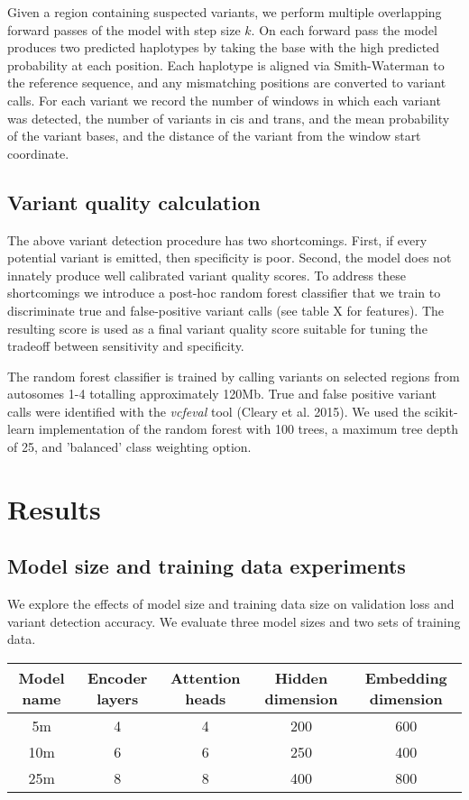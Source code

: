 \documentclass[]{article}
\begin{document}
Given a region containing suspected variants, we perform multiple overlapping forward passes of the model with step size $k$. On each forward pass the model produces two predicted haplotypes by taking the base with the high predicted probability at each position. Each haplotype is aligned via Smith-Waterman to the reference sequence, and any mismatching positions are converted to variant calls. For each variant we record the number of windows in which each variant was detected, the number of variants in cis and trans, and the mean probability of the variant bases, and the distance of the variant from the window start coordinate.

\subsection{Variant quality calculation}

The above variant detection procedure has two shortcomings. First, if every potential variant is emitted, then specificity is poor. Second, the model does not innately produce well calibrated variant quality scores. To address these shortcomings we introduce a post-hoc random forest classifier that we train to discriminate true and false-positive variant calls (see table X for features).  The resulting score is used as a final variant quality score suitable for tuning the tradeoff between sensitivity and specificity. 

The random forest classifier is trained by calling variants on selected regions from autosomes 1-4 totalling approximately 120Mb. True and false positive variant calls were identified with the \textit{vcfeval} tool (Cleary et al. 2015). We used the scikit-learn implementation of the random forest with 100 trees, a maximum tree depth of 25, and 'balanced' class weighting option.  


\section{Results}

\subsection{Model size and training data experiments}

We explore the effects of model size and training data size on validation loss and variant detection accuracy. We evaluate three model sizes and two sets of training data.

\begin{center}
	\begin{tabular}{ |c|c|c|c|c| }
	 Model name & Encoder layers & Attention heads & Hidden dimension & Embedding dimension \\ 
	\hline
	 5m & 4 & 4 & 200 & 600 \\ 
	 10m & 6 & 6 & 250 & 400 \\ 
	 25m & 8 & 8 & 400 & 800 \\ 
	 \hline
	\end{tabular}
\end{center}
\end{document}
